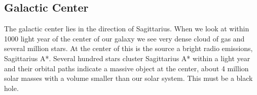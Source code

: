 \subsection{Galactic Center}
The galactic center lies in the direction of Sagittarius. When we look at within 1000 light year of the center of our galaxy we see very dense cloud of gas and several million stars. At the center of this is the source a bright radio emissions, Sagittarius A*. Several hundred stars cluster Sagittarius A* within a light year and their orbital paths indicate a massive object at the center, about 4 million solar masses with a volume smaller than our solar system. This must be a black hole.
